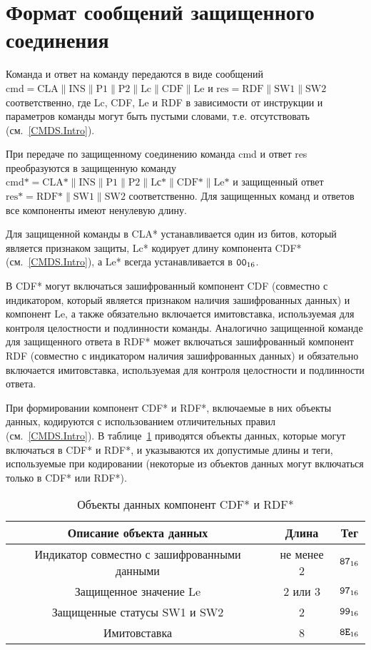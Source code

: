 \section{Формат сообщений защищенного соединения}
\label{CMDS.SM}

Команда и ответ на команду передаются в виде сообщений 
$\text{cmd} = \text{CLA} \parallel \text{INS} \parallel \text{P1} \parallel 
\text{P2} \parallel \text{Lc} \parallel \text{CDF} \parallel \text{Le}$ и 
$\text{res} = \text{RDF} \parallel \text{SW1} \parallel \text{SW2}$ 
соответственно, где 
Lc, CDF, Le и RDF в зависимости от инструкции и параметров команды могут 
быть пустыми словами, т.е. отсутствовать (см.~\ref{CMDS.Intro}). 

При передаче по защищенному соединению команда cmd и ответ res 
преобразуются в защищенную команду 
$\text{cmd*} = \text{CLA*} \parallel \text{INS} \parallel \text{P1} 
\parallel \text{P2} \parallel \text{Lс*} \parallel \text{CDF*} 
\parallel \text{Le*}$ и защищенный ответ 
$\text{res*} = \text{RDF*} \parallel \text{SW1} \parallel \text{SW2}$ 
соответственно. Для защищенных команд и ответов все компоненты имеют 
ненулевую длину. 

Для защищенной команды в CLA* устанавливается один из битов, который 
является признаком защиты, Lc* кодирует длину компонента CDF* 
(см.~\ref{CMDS.Intro}), а Le* всегда устанавливается в $\texttt{00}_{16}$.  

В CDF* могут включаться зашифрованный компонент CDF (совместно с 
индикатором, который является признаком наличия зашифрованных данных) и 
компонент Le, а также обязательно включается имитовставка, используемая 
для контроля целостности и подлинности команды.  Аналогично защищенной 
команде для защищенного ответа в RDF* может включаться зашифрованный 
компонент RDF (совместно с индикатором наличия зашифрованных данных) и 
обязательно включается имитовставка, используемая для контроля 
целостности и подлинности ответа. 

При формировании компонент CDF* и RDF*, включаемые в них объекты данных, 
кодируются с использованием отличительных правил (см.~\ref{CMDS.Intro}). 
В таблице~\ref{Table.CMDS.CDFRDF} 
приводятся объекты данных, которые могут включаться в CDF* и RDF*, и 
указываются их допустимые длины и теги, используемые при кодировании 
(некоторые из объектов данных могут включаться только в CDF* или RDF*). 

\begin{table}[h]
\caption{Объекты данных компонент CDF* и RDF*}
\label{Table.CMDS.CDFRDF}
\begin{tabular}{|c|c|c|}
\hline
Описание объекта данных & Длина & Тег \\
\hline
\hline
Индикатор совместно с зашифрованными данными & не менее 2 & $\texttt{87}_{16}$ \\
\hline
Защищенное значение Le & 2 или 3 & $\texttt{97}_{16}$\\
\hline
Защищенные статусы SW1 и SW2 & 2 & $\texttt{99}_{16}$ \\
\hline      
Имитовставка & 8 & $\texttt{8E}_{16}$ \\
\hline
\end{tabular}
\end{table}

